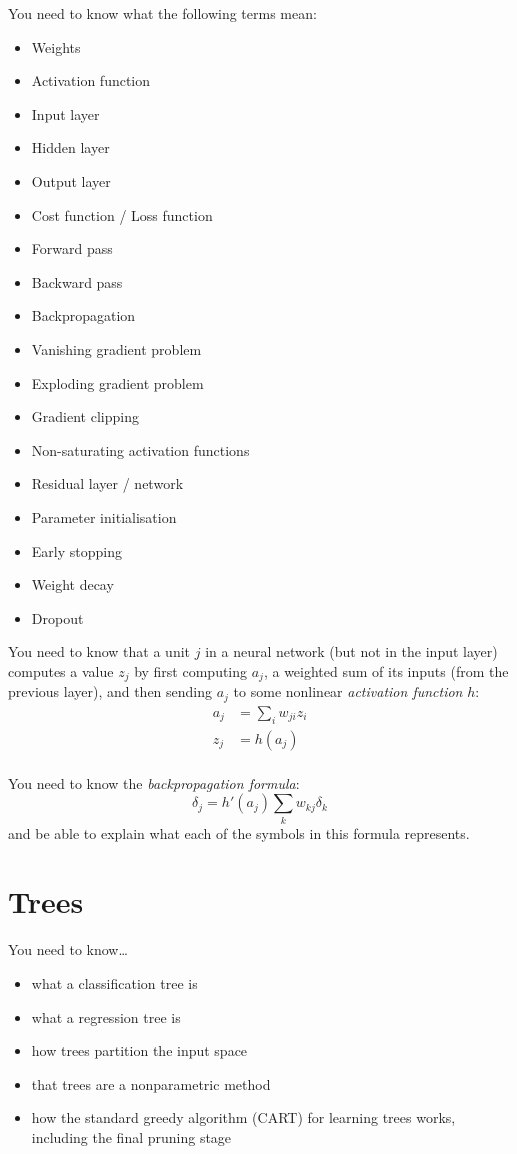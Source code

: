 \documentclass{article}
\newcommand{\yntk}{You need to know}
\begin{document}
\yntk{} what the following terms mean:
\begin{itemize}
\item Weights
\item Activation function
\item Input layer
\item Hidden layer
\item Output layer
\item Cost function / Loss function
\item Forward pass
\item Backward pass
\item Backpropagation
\item Vanishing gradient problem
\item Exploding gradient problem
\item Gradient clipping
\item Non-saturating activation functions
\item Residual layer / network
\item Parameter initialisation
\item Early stopping
\item Weight decay
\item Dropout
\end{itemize}

\yntk{} that a unit $j$ in a neural network (but not in the input
layer) computes a value $z_j$ by first computing $a_j$, a weighted sum
of its inputs (from the previous layer), and then sending $a_j$ to
some nonlinear \emph{activation function} $h$:
\begin{align}
  \label{eq:preact}
  a_{j} & = \sum_{i}w_{ji}z_{i} \\
  \label{eq:act}
  z_{j} & = h(a_{j}) \\
\end{align}

\yntk{} the \emph{backpropagation formula}:
\begin{equation}
  \label{eq:backprop}
  \delta_{j} = h'(a_{j})\sum_{k}w_{kj}\delta_{k}
\end{equation}
and be able to explain what each of the symbols in this formula represents.

\section{Trees}
\label{sec:trees}

\yntk \dots
\begin{itemize}
\item what a classification tree is
\item what a regression tree is
\item how trees partition the input space
\item that trees are a nonparametric method
\item how the standard greedy algorithm (CART) for learning trees works,
  including the final pruning stage
\end{itemize}
\end{document}

